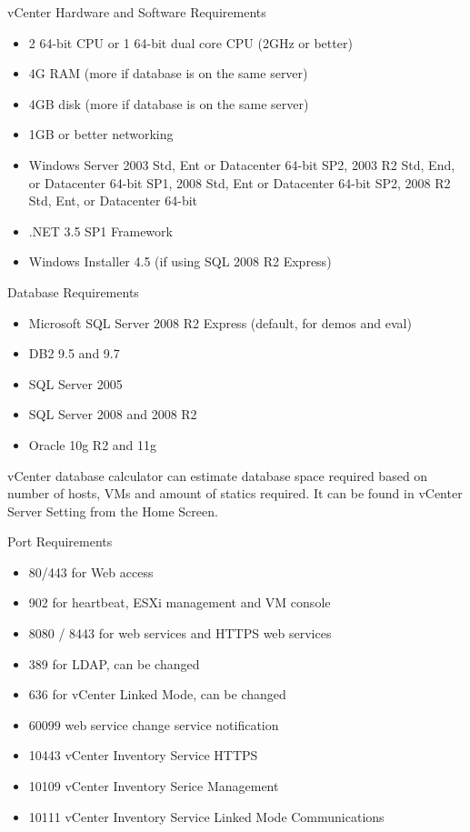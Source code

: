 vCenter Hardware and Software Requirements

\begin{itemize}
\item 2 64-bit CPU or 1 64-bit dual core CPU (2GHz or better)
\item 4G RAM (more if database is on the same server)
\item 4GB disk (more if database is on the same server)
\item 1GB or better networking
\item Windows Server 2003 Std, Ent or Datacenter 64-bit SP2, 2003 R2 Std, End, or Datacenter
64-bit SP1, 2008 Std, Ent or Datacenter 64-bit SP2, 2008 R2 Std, Ent, or Datacenter 64-bit
\item .NET 3.5 SP1 Framework
\item Windows Installer 4.5 (if using SQL 2008 R2 Express)
\end{itemize}

Database Requirements

\begin{itemize}
\item Microsoft SQL Server 2008 R2 Express (default, for demos and eval)
\item DB2 9.5 and 9.7
\item SQL Server 2005
\item SQL Server 2008 and 2008 R2
\item Oracle 10g R2 and 11g
\end{itemize}

vCenter database calculator can estimate database space required based on number of hosts,
VMs and amount of statics required. It can be found in vCenter Server Setting from the
Home Screen.

Port Requirements

\begin{itemize}
\item 80/443 for Web access
\item 902 for heartbeat, ESXi management and VM console
\item 8080 / 8443 for web services and HTTPS web services
\item 389 for LDAP, can be changed
\item 636 for vCenter Linked Mode, can be changed
\item 60099 web service change service notification
\item 10443 vCenter Inventory Service HTTPS
\item 10109 vCenter Inventory Serice Management
\item 10111 vCenter Inventory Service Linked Mode Communications
\end{itemize}

